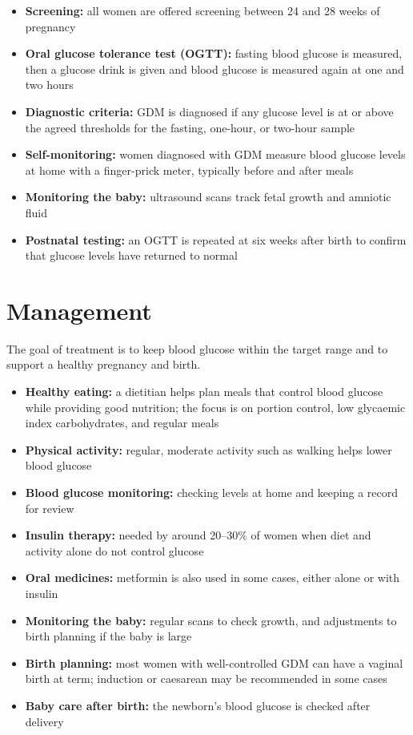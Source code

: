 \begin{itemize}
    \item \textbf{Screening:} all women are offered screening between 24 and 28 weeks of pregnancy
    \item \textbf{Oral glucose tolerance test (OGTT):} fasting blood glucose is measured, then a glucose drink is given and blood glucose is measured again at one and two hours
    \item \textbf{Diagnostic criteria:} GDM is diagnosed if any glucose level is at or above the agreed thresholds for the fasting, one-hour, or two-hour sample
    \item \textbf{Self-monitoring:} women diagnosed with GDM measure blood glucose levels at home with a finger-prick meter, typically before and after meals
    \item \textbf{Monitoring the baby:} ultrasound scans track fetal growth and amniotic fluid
    \item \textbf{Postnatal testing:} an OGTT is repeated at six weeks after birth to confirm that glucose levels have returned to normal
\end{itemize}

\section*{Management}
The goal of treatment is to keep blood glucose within the target range and to support a healthy pregnancy and birth.

\begin{itemize}
    \item \textbf{Healthy eating:} a dietitian helps plan meals that control blood glucose while providing good nutrition; the focus is on portion control, low glycaemic index carbohydrates, and regular meals
    \item \textbf{Physical activity:} regular, moderate activity such as walking helps lower blood glucose
    \item \textbf{Blood glucose monitoring:} checking levels at home and keeping a record for review
    \item \textbf{Insulin therapy:} needed by around 20--30\% of women when diet and activity alone do not control glucose
    \item \textbf{Oral medicines:} metformin is also used in some cases, either alone or with insulin
    \item \textbf{Monitoring the baby:} regular scans to check growth, and adjustments to birth planning if the baby is large
    \item \textbf{Birth planning:} most women with well-controlled GDM can have a vaginal birth at term; induction or caesarean may be recommended in some cases
    \item \textbf{Baby care after birth:} the newborn's blood glucose is checked after delivery
\end{itemize}

